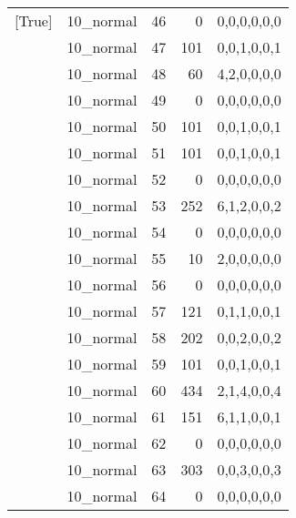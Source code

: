 \begin{tabular}{llrrl}
 [True]          & 10\_normal           &            46 &                     0 & 0,0,0,0,0,0   \\
 [True]          & 10\_normal           &            47 &                   101 & 0,0,1,0,0,1   \\
 [True]          & 10\_normal           &            48 &                    60 & 4,2,0,0,0,0   \\
 [True]          & 10\_normal           &            49 &                     0 & 0,0,0,0,0,0   \\
 [True]          & 10\_normal           &            50 &                   101 & 0,0,1,0,0,1   \\
 [True]          & 10\_normal           &            51 &                   101 & 0,0,1,0,0,1   \\
 [True]          & 10\_normal           &            52 &                     0 & 0,0,0,0,0,0   \\
 [True]          & 10\_normal           &            53 &                   252 & 6,1,2,0,0,2   \\
 [True]          & 10\_normal           &            54 &                     0 & 0,0,0,0,0,0   \\
 [True]          & 10\_normal           &            55 &                    10 & 2,0,0,0,0,0   \\
 [True]          & 10\_normal           &            56 &                     0 & 0,0,0,0,0,0   \\
 [True]          & 10\_normal           &            57 &                   121 & 0,1,1,0,0,1   \\
 [True]          & 10\_normal           &            58 &                   202 & 0,0,2,0,0,2   \\
 [True]          & 10\_normal           &            59 &                   101 & 0,0,1,0,0,1   \\
 [True]          & 10\_normal           &            60 &                   434 & 2,1,4,0,0,4   \\
 [True]          & 10\_normal           &            61 &                   151 & 6,1,1,0,0,1   \\
 [True]          & 10\_normal           &            62 &                     0 & 0,0,0,0,0,0   \\
 [True]          & 10\_normal           &            63 &                   303 & 0,0,3,0,0,3   \\
 [True]          & 10\_normal           &            64 &                     0 & 0,0,0,0,0,0   \\

\end{tabular}
